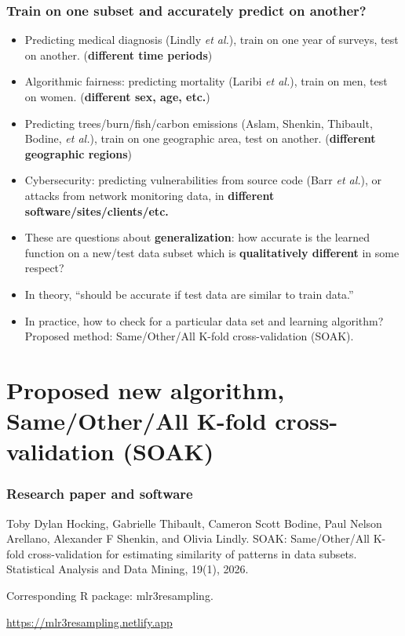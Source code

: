 \documentclass[t,aspectratio=1610]{beamer}
\begin{document}
\begin{frame}
  \frametitle{Train on one subset and accurately predict on another?} 
  \begin{itemize}
  \item Predicting medical diagnosis (Lindly \emph{et al.}), train on
    one year of surveys, test on another. (\textbf{different time periods})
  \item Algorithmic fairness: predicting mortality (Laribi \emph{et al.}), train on men, test on women. (\textbf{different sex, age, etc.})
  \item Predicting trees/burn/fish/carbon emissions
    (Aslam, Shenkin, Thibault, Bodine, \emph{et al.}), train on
    one geographic area, test on another. (\textbf{different geographic regions})
  \item Cybersecurity: predicting vulnerabilities from source code (Barr \emph{et al.}), or attacks from network monitoring data, in \textbf{different software/sites/clients/etc.} 
  \item These are questions about \textbf{generalization}: how accurate
    is the learned function on a new/test data subset which is
    \textbf{qualitatively different} in some respect?
  \item In theory, ``should be accurate if test data are similar to train data.''
    \item In practice, how to check for a particular data set and learning algorithm? Proposed method: Same/Other/All K-fold cross-validation (SOAK).
  \end{itemize}
\end{frame}

\section{Proposed new algorithm, Same/Other/All K-fold cross-validation (SOAK)}

\begin{frame}
  \frametitle{Research paper and software}
  Toby Dylan Hocking, Gabrielle Thibault, Cameron Scott Bodine, Paul Nelson Arellano, Alexander F
Shenkin, and Olivia Lindly. SOAK: Same/Other/All K-fold cross-validation for estimating similarity of
patterns in data subsets. Statistical Analysis and Data Mining, 19(1), 2026.

\vskip 1in
Corresponding R package: mlr3resampling.

\url{https://mlr3resampling.netlify.app}
\end{frame}
\end{document}
